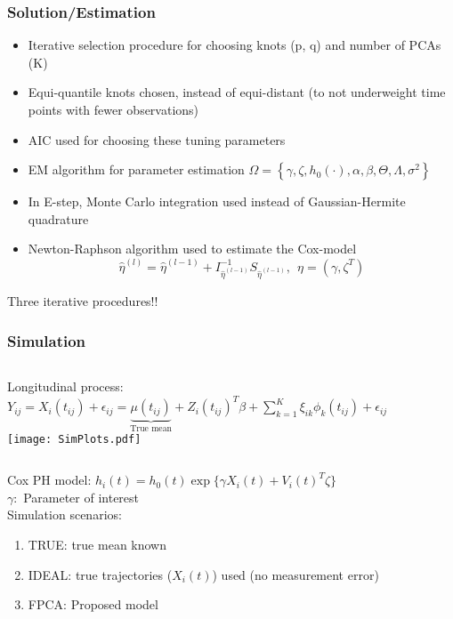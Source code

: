 \documentclass[10pt,dvipsnames,table, handout]{beamer} %
\begin{document}
\begin{frame}
\frametitle{Solution/Estimation}
\begin{itemize}
\item Iterative selection procedure for choosing knots (p, q) and number of PCAs (K)
\item Equi-quantile knots chosen, instead of equi-distant (to not underweight time points with fewer observations)
\item AIC used for choosing these tuning parameters
\pause \item EM algorithm for parameter estimation $ \Omega = \left\{ \gamma, \zeta, h_0(\cdot), \alpha, \beta, \Theta, \Lambda, \sigma^2 \right\} $
\item In E-step, Monte Carlo integration used instead of Gaussian-Hermite quadrature
\pause \item Newton-Raphson algorithm used to estimate the Cox-model 
\[ \hat{\eta}^{(l)} = \hat{\eta}^{(l-1)} + I^{-1}_{\hat{\eta}^{(l-1)}} S_{\hat{\eta}^{(l-1)}},\ \ \eta = (\gamma, \zeta^T)\]
\end{itemize}
\pause
\begin{center}
Three iterative procedures!! 
\end{center}
\end{frame}

\begin{frame}
\frametitle{Simulation}
\begin{columns}
Longitudinal process: \\ 
$ Y_{ij} =  X_i(t_{ij}) + \epsilon _{ij} 
= \underbrace{\mu(t_{ij})}_{\text{True mean}} + Z_i(t_{ij})^T\beta + \sum_{k=1}^{K} \xi_{ik} \phi_k (t_{ij})+ \epsilon_{ij}$ \\
\texttt{[image: SimPlots.pdf]} \\
\end{columns}
\vspace{0.5cm}
\pause
Cox PH model: $ h_i(t) = h_0(t)\exp\{\gamma X_i(t) + V_i(t)^T \zeta \}$ \\
$\gamma: $ Parameter of interest \\
\pause
Simulation scenarios:
\begin{enumerate}
\item TRUE: true mean known
\item IDEAL: true trajectories ($X_i(t)$) used (no measurement error)
\item FPCA: Proposed model
\end{enumerate}
\end{frame}
\end{document}
